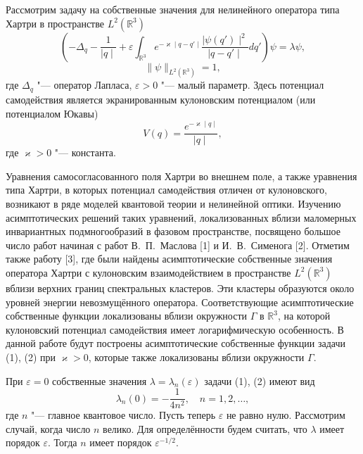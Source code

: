 
\vzmscaption

Рассмотрим задачу на собственные значения для нелинейного
оператора типа Хартри в  пространстве $L^2(\mathbb{R}^3)$
\begin{equation}
( -{\Delta}_q-\frac {1}{\mid q \mid}+ \varepsilon \int_{\mathbb{R}^3}  e^{-\varkappa \mid q-q' \mid}\frac {\mid \psi(q') \mid^2}
{\mid q-q' \mid}dq')\psi=\lambda\psi,
\end{equation}
\begin{equation}
\|\psi\|_{L^2(\mathbb{R}^3)}=1,
\end{equation}
где  ${\Delta}_q $ "--- оператор Лапласа, $\varepsilon > 0 $ "--- малый параметр. Здесь потенциал
самодействия является экранированным кулоновским потенциалом (или потенциалом Юкавы)
$$
V(q)=\frac {e^{-\varkappa \mid q \mid}}{ \mid q \mid},
$$
где $\varkappa > 0 $  "--- константа.

Уравнения самосогласованного поля Хартри во внешнем поле, а также уравнения типа Хартри, в которых потенциал
самодействия отличен от кулоновского, возникают в ряде моделей квантовой теории и нелинейной оптики.
Изучению асимптотических решений таких уравнений,  локализованных вблизи маломерных
инвариантных подмногообразий в фазовом пространстве, посвящено большое число работ начиная с работ В.~П.~Маслова [1]  и И.~В.~Сименога [2].
Отметим также работу [3], где были найдены асимптотические собственные значения
оператора Хартри  с кулоновским взаимодействием в пространстве $L^2(\mathbb{R}^3)$
вблизи верхних границ спектральных кластеров. Эти кластеры
образуются около уровней энергии  невозмущённого оператора.  Соответствующие асимптотические собственные функции
локализованы вблизи окружности   $ \Gamma $ в $\mathbb{R}^3$, на которой кулоновский потенциал самодействия имеет
логарифмическую особенность.  В данной работе будут
построены асимптотические собственные функции задачи  (1), (2) при  $\varkappa > 0 $, которые также локализованы вблизи
окружности $ \Gamma $.

 При $\varepsilon = 0 $ собственные значения
 $\lambda=\lambda_ n (\varepsilon) $   задачи (1), (2) имеют вид
 $$
\lambda_ n (0)=-\frac {1}{4n^2}, \quad  n=1,2,\dots ,
$$
где $ n $ "--- главное квантовое число. Пусть теперь $\varepsilon $ не равно нулю.
 Рассмотрим случай, когда число $n$ велико.
Для определённости будем считать, что $\lambda$ имеет порядок
 $\varepsilon$. Тогда $n$  имеет порядок    $\varepsilon^{-1/2}$.

